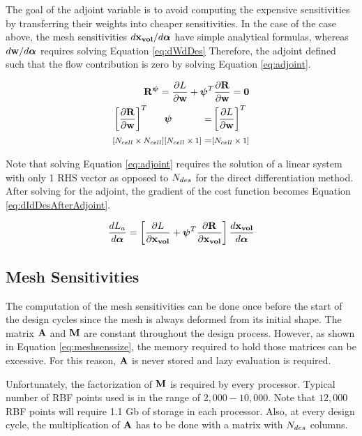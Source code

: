 \documentclass[letterpaper,12pt,]{article}
\begin{document}
The goal of the adjoint variable is to avoid computing the expensive sensitivities by transferring their weights into cheaper sensitivities.
In the case of the case above, the mesh sensitivities ${d\mathbf{x_{vol}}}/{d\boldsymbol{\alpha}}$ have simple analytical formulas, whereas ${d\mathbf{w}}/{d\boldsymbol{\alpha}}$ requires solving Equation \ref{eq:dWdDes}
Therefore, the adjoint defined such that the flow contribution is zero by solving Equation \ref{eq:adjoint}.

\begin{equation}
\begin{split}
	\mathbf{R}^{\boldsymbol{\psi}} =
	\dfrac{\partial L}{\partial\mathbf{w}}
	+
	\boldsymbol{\psi}^T
	\dfrac{\partial\mathbf{R}}{\partial\mathbf{w}}
	= \mathbf{0}
	\\
\begin{alignedat}{4}
	&\left[\dfrac{\partial\mathbf{R}}{\partial\mathbf{w}}\right]^T
	&&\boldsymbol{\psi}
	&&=
	&&\left[\dfrac{\partial L}{\partial\mathbf{w}}\right]^T
\\	
	& \text{\footnotesize$\left[ N_{cell} \times N_{cell} \right]$}
	&&\text{\footnotesize$\left[ N_{cell} \times 1 \right]$}
	&&=
	&&\text{\footnotesize$\left[ N_{cell} \times 1 \right]$}
\label{eq:adjoint}
\end{alignedat}
\end{split}
\end{equation}

Note that solving Equation \ref{eq:adjoint} requires the solution of a linear system with only 1 RHS vector as opposed to $N_{des}$ for the direct differentiation method.
After solving for the adjoint, the gradient of the cost function becomes Equation \ref{eq:dIdDesAfterAdjoint}.

\begin{equation}
	\dfrac{dL_a}{d\boldsymbol{\alpha}} = 
	\left[
		\dfrac{\partial L}{\partial\mathbf{x_{vol}}}
		+
		\boldsymbol{\psi}^T
		\dfrac{\partial\mathbf{R}}{\partial\mathbf{x_{vol}}}
	\right]
	\dfrac{d\mathbf{x_{vol}}}{d\boldsymbol{\alpha}}
	\label{eq:dIdDesAfterAdjoint}
\end{equation}

\subsection*{Mesh Sensitivities}

The computation of the mesh sensitivities can be done once before the start of the design cycles since the mesh is always deformed from its initial shape.
The matrix $\mathbf{A}$ and $\mathbf{M}$ are constant throughout the design process.
However, as shown in Equation \ref{eq:meshsenssize}, the memory required to hold those matrices can be excessive.
For this reason, $\mathbf{A}$ is never stored and lazy evaluation is required.

Unfortunately, the factorization of $\mathbf{M}$ is required by every processor.
Typical number of RBF points used is in the range of $2,000-10,000$.
Note that $12,000$ RBF points will require 1.1 Gb of storage in each processor.
Also, at every design cycle, the multiplication of $\mathbf{A}$ has to be done with a matrix with $N_{des}$ columns.
\end{document}
